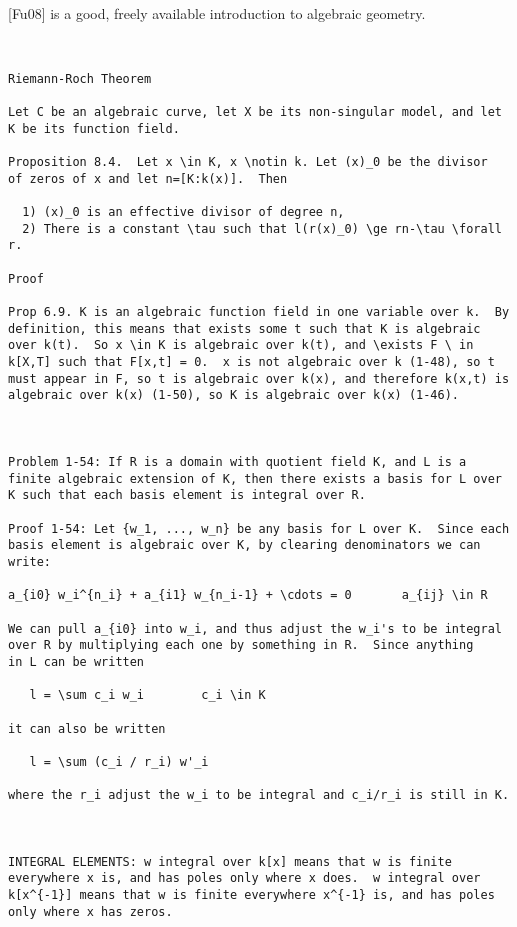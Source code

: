 \vfill\eject
{}

[Fu08] is a good, freely available introduction to algebraic geometry.

\begin{verbatim}


Riemann-Roch Theorem

Let C be an algebraic curve, let X be its non-singular model, and let
K be its function field.

Proposition 8.4.  Let x \in K, x \notin k. Let (x)_0 be the divisor
of zeros of x and let n=[K:k(x)].  Then

  1) (x)_0 is an effective divisor of degree n,
  2) There is a constant \tau such that l(r(x)_0) \ge rn-\tau \forall r.

Proof

Prop 6.9. K is an algebraic function field in one variable over k.  By
definition, this means that exists some t such that K is algebraic
over k(t).  So x \in K is algebraic over k(t), and \exists F \ in
k[X,T] such that F[x,t] = 0.  x is not algebraic over k (1-48), so t
must appear in F, so t is algebraic over k(x), and therefore k(x,t) is
algebraic over k(x) (1-50), so K is algebraic over k(x) (1-46).



Problem 1-54: If R is a domain with quotient field K, and L is a
finite algebraic extension of K, then there exists a basis for L over
K such that each basis element is integral over R.

Proof 1-54: Let {w_1, ..., w_n} be any basis for L over K.  Since each
basis element is algebraic over K, by clearing denominators we can
write:

a_{i0} w_i^{n_i} + a_{i1} w_{n_i-1} + \cdots = 0       a_{ij} \in R

We can pull a_{i0} into w_i, and thus adjust the w_i's to be integral
over R by multiplying each one by something in R.  Since anything
in L can be written

   l = \sum c_i w_i        c_i \in K

it can also be written

   l = \sum (c_i / r_i) w'_i

where the r_i adjust the w_i to be integral and c_i/r_i is still in K.



INTEGRAL ELEMENTS: w integral over k[x] means that w is finite
everywhere x is, and has poles only where x does.  w integral over
k[x^{-1}] means that w is finite everywhere x^{-1} is, and has poles
only where x has zeros.


\end{verbatim}
